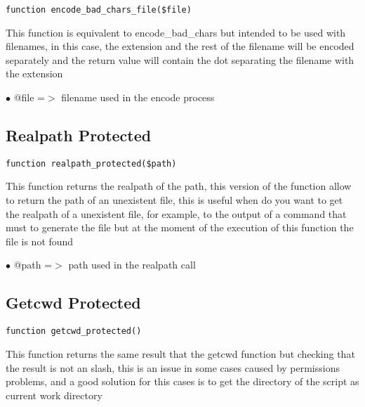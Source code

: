 \documentclass[a4paper]{book}
\begin{document}
\begin{lstlisting}
function encode_bad_chars_file($file)
\end{lstlisting}

This function is equivalent to encode\_bad\_chars but intended to be used
with filenames, in this case, the extension and the rest of the filename
will be encoded separately and the return value will contain the dot
separating the filename with the extension

\begin{compactitem}
\item[\color{myblue}$\bullet$] @file =$>$ filename used in the encode process
\end{compactitem}

\hypertarget{toc134}{}
\subsection{Realpath Protected}

\begin{lstlisting}
function realpath_protected($path)
\end{lstlisting}

This function returns the realpath of the path, this version of the function
allow to return the path of an unexistent file, this is useful when do you
want to get the realpath of a unexistent file, for example, to the output of
a command that must to generate the file but at the moment of the execution
of this function the file is not found

\begin{compactitem}
\item[\color{myblue}$\bullet$] @path =$>$ path used in the realpath call
\end{compactitem}

\hypertarget{toc135}{}
\subsection{Getcwd Protected}

\begin{lstlisting}
function getcwd_protected()
\end{lstlisting}

This function returns the same result that the getcwd function but checking
that the result is not an slash, this is an issue in some cases caused by
permissions problems, and a good solution for this cases is to get the directory
of the script as current work directory
\end{document}

